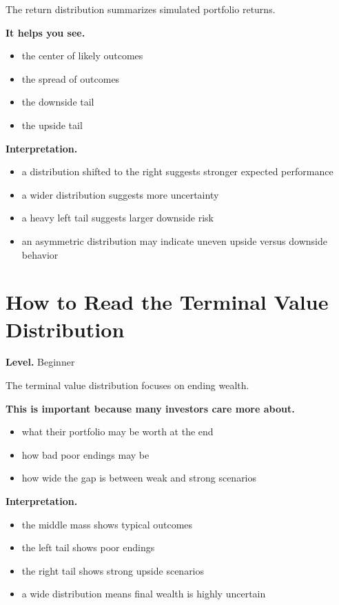 \documentclass[11pt]{report}
\begin{document}
The return distribution summarizes simulated portfolio returns.

\textbf{It helps you see.}

\begin{itemize}
\item the center of likely outcomes
\item the spread of outcomes
\item the downside tail
\item the upside tail
\end{itemize}

\textbf{Interpretation.}

\begin{itemize}
\item a distribution shifted to the right suggests stronger expected performance
\item a wider distribution suggests more uncertainty
\item a heavy left tail suggests larger downside risk
\item an asymmetric distribution may indicate uneven upside versus downside behavior
\end{itemize}

\section{How to Read the Terminal Value Distribution}
\begin{callout}
\textbf{Level.} Beginner
\end{callout}

The terminal value distribution focuses on ending wealth.

\textbf{This is important because many investors care more about.}

\begin{itemize}
\item what their portfolio may be worth at the end
\item how bad poor endings may be
\item how wide the gap is between weak and strong scenarios
\end{itemize}

\textbf{Interpretation.}

\begin{itemize}
\item the middle mass shows typical outcomes
\item the left tail shows poor endings
\item the right tail shows strong upside scenarios
\item a wide distribution means final wealth is highly uncertain
\end{itemize}
\end{document}
